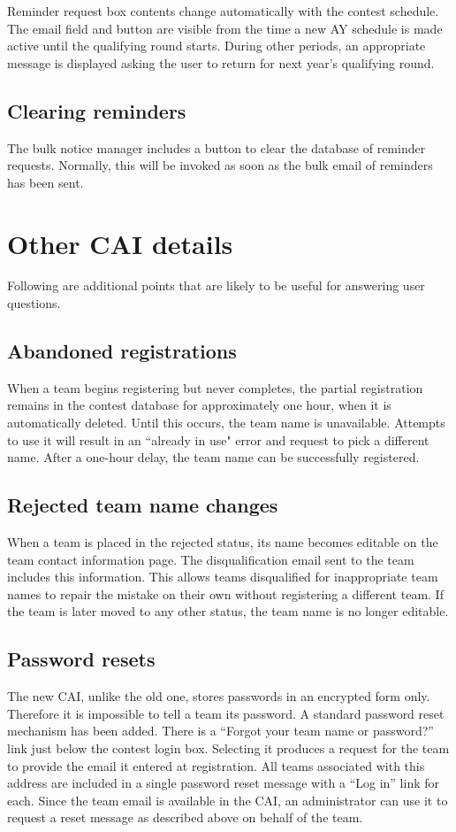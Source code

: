 \documentclass[11pt,letterpaper]{refart}
\begin{document}
Reminder request box contents change automatically with the contest schedule.
The email field and button are visible from the time a new AY schedule is made active until
the qualifying round starts. During other periods, an appropriate message is
displayed asking the user to return for next year's qualifying round.

\subsection{Clearing reminders}
The bulk notice manager includes a button to clear the database of reminder requests.
Normally, this will be invoked as soon as the bulk email of reminders has been sent.

\section{Other CAI details}
Following are additional points that are likely to be useful for
answering user questions.

\subsection{Abandoned registrations}
When a team begins registering but never completes, the partial registration remains
in the contest database for approximately one hour, when it is automatically deleted.  Until
this occurs, the team name is unavailable.  Attempts to use it will result in an ``already in
use" error and request to pick a different name. After a one-hour delay, the team name 
can be successfully registered. 

\subsection{Rejected team name changes}
When a team is placed in the rejected status, its name becomes editable on
the team contact information page. The disqualification email sent to the team includes this 
information. This allows teams disqualified for inappropriate team names to repair the 
mistake on their own without registering a different team.  If the team is later moved to any 
other status, the team name is no longer editable.

\subsection{Password resets}
The new CAI, unlike the old one, stores passwords in an encrypted form only.  Therefore it
is impossible to tell a team its password.  A standard password reset mechanism has been
added.  There is a ``Forgot your team name or password?'' link just below the contest login
box. Selecting it produces  a request for the team to provide the email it entered at registration. 
All teams associated with this address are included in a single password reset message with
a ``Log in'' link for each. Since the team email is available in the CAI, an administrator can 
use it to request a reset message as described above on behalf of the team. 
\end{document}
